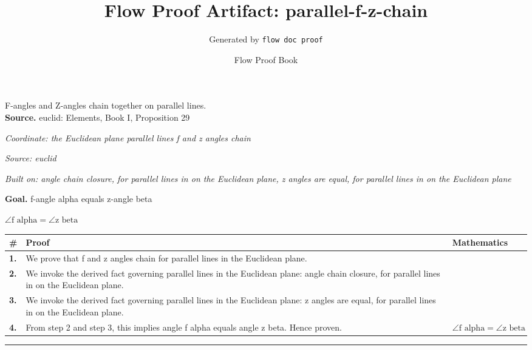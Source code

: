 \documentclass[11pt]{article}
\title{Flow Proof Artifact: parallel-f-z-chain}
\author{Generated by \texttt{flow doc proof}}
\date{Flow Proof Book}
\theoremstyle{definition}
\begin{document}
\maketitle
F-angles and Z-angles chain together on parallel lines.\\[0.5em]
\textbf{Source.} euclid: Elements, Book I, Proposition 29\\[0.5em]
\bigskip
{}\par
\smallskip\noindent\textit{Coordinate: the Euclidean plane \cdot parallel lines \cdot f and z angles chain}\par
\smallskip\noindent\textit{Source: euclid}\par
\smallskip\noindent\textit{Built on: angle chain closure, for parallel lines in on the Euclidean plane, z angles are equal, for parallel lines in on the Euclidean plane}\par
\medskip
\noindent\textbf{Goal.} f-angle alpha equals z-angle beta\par
\noindent$\displaystyle \angle \text{f alpha} = \angle \text{z beta}$\par
\medskip
\noindent
\begin{tabular}{@{} >{\raggedright\arraybackslash}p{} >{\raggedright\arraybackslash}p{} >{\raggedleft\arraybackslash}p{} @{}}
\textbf{\#} & \textbf{Proof} & \textbf{Mathematics} \\
\midrule
\textbf{1.} & We prove that f and z angles chain for parallel lines in the Euclidean plane. & \\[0.45em]
\textbf{2.} & We invoke the derived fact governing parallel lines in the Euclidean plane: angle chain closure, for parallel lines in on the Euclidean plane. & \\[0.45em]
\textbf{3.} & We invoke the derived fact governing parallel lines in the Euclidean plane: z angles are equal, for parallel lines in on the Euclidean plane. & \\[0.45em]
\textbf{4.} & From step 2 and step 3, this implies angle f alpha equals angle z beta. Hence proven. & $\displaystyle \angle \text{f alpha} = \angle \text{z beta}$ \\[0.45em]
\bottomrule
\end{tabular}
\label{thm:Geometry-parallel lines-f_and_z_angles_chain}
\par\medskip\hrule
\end{document}
